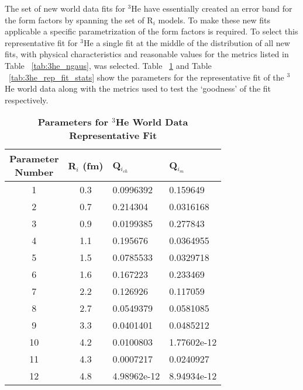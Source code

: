 The set of new world data fits for $^3$He have essentially created an error band for the form factors by spanning the set of R$_i$ models. To make these new fits applicable a specific parametrization of the form factors is required. To select this representative fit for $^3$He a single fit at the middle of the distribution of all new fits, with physical characteristics and reasonable values for the metrics listed in Table ~\ref{tab:3he_ngaus}, was selected. Table ~\ref{tab:3he_rep_fit_pars} and Table ~\ref{tab:3he_rep_fit_stats} show the parameters for the representative fit of the $^3$He world data along with the metrics used to test the `goodness' of the fit respectively.

\begin{table}[!h]
\centering
\begin{tabular}{|c c l l|}
\hline
\makecell{\textbf{Parameter}\\ \textbf{Number}} & \textbf{R$_i$ (fm)} & \textbf{Q$_{i_{ch}}$} & \textbf{Q$_{i_{m}}$}\\
\hline
1 & 0.3 & 0.0996392 & 0.159649 \\
2 & 0.7 & 0.214304 & 0.0316168 \\
3 & 0.9 & 0.0199385 & 0.277843 \\
4 & 1.1 & 0.195676 & 0.0364955 \\
5 & 1.5 & 0.0785533 & 0.0329718 \\
6 & 1.6 & 0.167223 & 0.233469 \\
7 & 2.2 & 0.126926 & 0.117059 \\
8 & 2.7 & 0.0549379 & 0.0581085 \\
9 & 3.3 & 0.0401401 & 0.0485212 \\
10 & 4.2 & 0.0100803 & 1.77602e-12 \\
11 & 4.3 & 0.0007217 & 0.0240927 \\
12 & 4.8 & 4.98962e-12 & 8.94934e-12 \\           
\hline
\end{tabular}
\caption{\bf{Parameters for $^3$He World Data Representative Fit}}
\label{tab:3he_rep_fit_pars}
\end{table}

